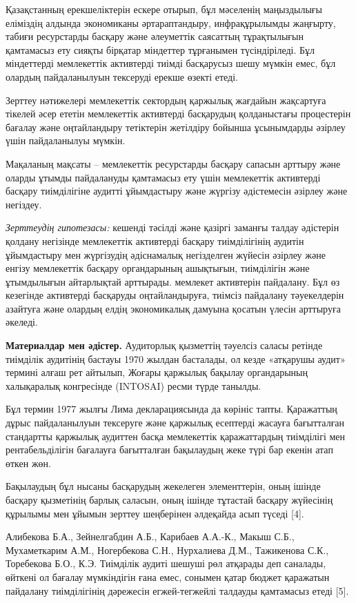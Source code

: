 Қазақстанның ерекшеліктерін ескере отырып, бұл мәселенің маңыздылығы
еліміздің алдында экономиканы әртараптандыру, инфрақұрылымды жаңғырту,
табиғи ресурстарды басқару және әлеуметтік саясаттың тұрақтылығын
қамтамасыз ету сияқты бірқатар міндеттер тұрғанымен түсіндіріледі. Бұл
міндеттерді мемлекеттік активтерді тиімді басқарусыз шешу мүмкін емес,
бұл олардың пайдаланылуын тексеруді ерекше өзекті етеді.

Зерттеу нәтижелері мемлекеттік сектордың қаржылық жағдайын жақсартуға
тікелей әсер ететін мемлекеттік активтерді басқарудың қолданыстағы
процестерін бағалау және оңтайландыру тетіктерін жетілдіру бойынша
ұсынымдарды әзірлеу үшін пайдаланылуы мүмкін.

Мақаланың мақсаты -- мемлекеттік ресурстарды басқару сапасын арттыру
және оларды ұтымды пайдалануды қамтамасыз ету үшін мемлекеттік
активтерді басқару тиімділігіне аудитті ұйымдастыру және жүргізу
әдістемесін әзірлеу және негіздеу.

\emph{Зерттеудің гипотезасы:} кешенді тәсілді және қазіргі заманғы
талдау әдістерін қолдану негізінде мемлекеттік активтерді басқару
тиімділігінің аудитін ұйымдастыру мен жүргізудің әдіснамалық негізделген
жүйесін әзірлеу және енгізу мемлекеттік басқару органдарының ашықтығын,
тиімділігін және ұтымдылығын айтарлықтай арттырады. мемлекет активтерін
пайдалану. Бұл өз кезегінде активтерді басқаруды оңтайландыруға, тиімсіз
пайдалану тәуекелдерін азайтуға және олардың елдің экономикалық дамуына
қосатын үлесін арттыруға әкеледі.

{\bfseries Материалдар мен әдістер.} Аудиторлық қызметтің тәуелсіз саласы
ретінде тиімділік аудитінің бастауы 1970 жылдан басталады, ол кезде
«атқарушы аудит» термині алғаш рет айтылып, Жоғары қаржылық бақылау
органдарының халықаралық конгресінде (INTOSAI) ресми түрде танылды.

Бұл термин 1977 жылғы Лима декларациясында да көрініс тапты. Қаражаттың
дұрыс пайдаланылуын тексеруге және қаржылық есептерді жасауға
бағытталған стандартты қаржылық аудиттен басқа мемлекеттік қаражаттардың
тиімділігі мен рентабельділігін бағалауға бағытталған бақылаудың жеке
түрі бар екенін атап өткен жөн.

Бақылаудың бұл нысаны басқарудың жекелеген элементтерін, оның ішінде
басқару қызметінің барлық саласын, оның ішінде тұтастай басқару
жүйесінің құрылымы мен ұйымын зерттеу шеңберінен әлдеқайда асып түседі
{[}4{]}.

Алибекова Б.А., Зейнелгабдин А.Б., Карибаев А.А.-К., Макыш С.Б.,
Мухаметкарим А.М., Ногербекова С.Н., Нурхалиева Д.М., Тажикенова С.К.,
Торебекова Б.О., К.Э. Тиімділік аудиті шешуші рөл атқарады деп саналады,
өйткені ол бағалау мүмкіндігін ғана емес, сонымен қатар бюджет қаражатын
пайдалану тиімділігінің дәрежесін егжей-тегжейлі талдауды қамтамасыз
етеді {[}5{]}.

